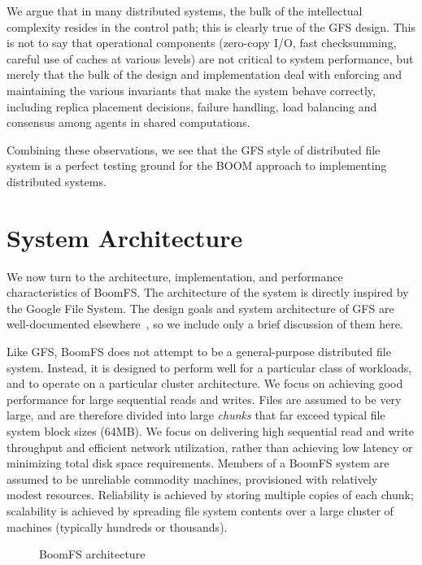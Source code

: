 \documentclass[twocolumn]{article}
\begin{document}
We argue that in many distributed systems, the bulk of the
intellectual complexity resides in the control path; this is clearly
true of the GFS design. This is not to say that operational components
(zero-copy I/O, fast checksumming, careful use of caches at various
levels) are not critical to system performance, but merely that the
bulk of the design and implementation deal with enforcing and
maintaining the various invariants that make the system behave
correctly, including replica placement decisions, failure handling,
load balancing and consensus among agents in shared computations.

Combining these observations, we see that the GFS style of distributed
file system is a perfect testing ground for the BOOM approach to
implementing distributed systems.

\section{System Architecture}
\label{system-arch}
We now turn to the architecture, implementation, and performance
characteristics of BoomFS. The architecture of the system is directly
inspired by the Google File System. The design goals and system
architecture of GFS are well-documented elsewhere~\cite{gfs,
  hdfs-arch}, so we include only a brief discussion of them here.

Like GFS, BoomFS does not attempt to be a general-purpose distributed
file system. Instead, it is designed to perform well for a particular
class of workloads, and to operate on a particular cluster
architecture. We focus on achieving good performance for large
sequential reads and writes. Files are assumed to be very large, and
are therefore divided into large \emph{chunks} that far exceed typical
file system block sizes (64MB). We focus on delivering high sequential
read and write throughput and efficient network utilization, rather
than achieving low latency or minimizing total disk space
requirements. Members of a BoomFS system are assumed to be unreliable
commodity machines, provisioned with relatively modest resources.
Reliability is achieved by storing multiple copies of each chunk;
scalability is achieved by spreading file system contents over a large
cluster of machines (typically hundreds or thousands).

\begin{figure}
\centering
{}
\caption{BoomFS architecture}
\label{fig:system-arch}
\end{figure}
\end{document}
